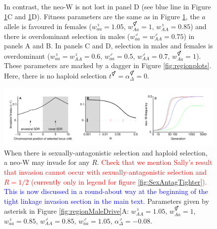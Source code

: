 \documentclass[12pt]{article}
\begin{document}
\begin{figure}[!h]
{In contrast, the neo-W is not lost in panel D (see blue line in Figure \ref{fig:temporalOverdominance}C and  \ref{fig:temporalOverdominance}D). 
Fitness parameters are the same as in Figure \ref{fig:temporalOverdominance}, the $a$ allele is favoured in females ($w_{aa}^\female=1.05$, $w_{Aa}^\Hermaphrodite=1$, $w_{AA}^\female=0.85$) and there is overdominant selection in males ($w_{aa}^\male=w_{AA}^\male=0.75$) in panels A and B.
In panels C and D, selection in males and females is overdominant ($w_{aa}^\female=w_{AA}^\female=0.6$, $w_{aa}^\male=0.5$, $w_{AA}^\male=0.7$, $w_{Aa}^\Hermaphrodite=1$). 
These parameters are marked by a dagger in Figure \ref{fig:regionplots}. 
Here, there is no haploid selection $t^\Hermaphrodite = \alpha^\Hermaphrodite_\Delta = 0$.
}
\label{fig:temporalOverdominance}
\end{figure}

\begin{figure}[!h]
\centering
\centerline{\includegraphics[width=1.5\linewidth]{PositionPlot_SexAntagTighter_MaleDrive_Mike}}
\caption{
When there is sexually-antagonistic selection and haploid selection, a neo-W may invade for any $R$.
\textcolor{red}{
Check that we mention Sally's result that invasion cannot occur with sexually-antagonistic selection and $R=1/2$ (currently only in legend for figure \ref{fig:SexAntagTighter}). 
}
\textcolor{blue}{This is now discussed in a round-about way at the beginning of the tight linkage invasion section in the main text. }
Parameters given by asterisk in Figure \ref{fig:regionMaleDrive}A: $w_{AA}^\female=1.05$, $w_{Aa}^\Hermaphrodite=1$, $w_{aa}^\female=0.85$, $w_{AA}^\male=0.85$, $w_{aa}^\male=1.05$, $\alpha_{\Delta}^\male=-0.08$.
}
\label{fig:SexAntagTighterMaleDrive}
\end{figure}
\end{document}
